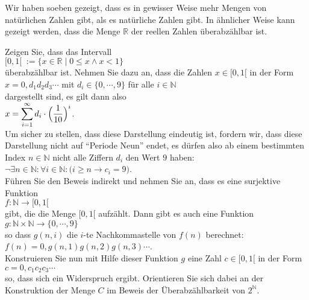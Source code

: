 \remark
Wir haben soeben gezeigt, dass es in gewisser Weise mehr Mengen von nat\"{u}rlichen Zahlen gibt, als es
nat\"{u}rliche Zahlen gibt.  In \"{a}hnlicher Weise kann gezeigt werden, dass die Menge $\mathbb{R}$ der reellen
Zahlen \"{u}berabz\"{a}hlbar ist.  

\exercise
Zeigen Sie, dass das Intervall
\\[0.2cm]
\hspace*{1.3cm}
$[0,1[ \;:= \{ x \in \mathbb{R} \mid 0 \leq x \wedge x < 1 \}$ 
\\[0.2cm]
\"{u}berabz\"{a}hlbar ist.  Nehmen Sie dazu an, dass die Zahlen $x \in [0,1[$ in der Form
\\[0.2cm]
\hspace*{1.3cm}
$ x = 0, d_1 d_2 d_3 \cdots$ \quad mit $d_i \in \{ 0, \cdots, 9 \}$  f\"{u}r alle $i \in \mathbb{N}$
\\[0.2cm]
dargestellt sind, es gilt dann also
\\[0.2cm]
\hspace*{1.3cm}
$\displaystyle x = \sum\limits_{i=1}^\infty d_i \cdot \Bigl(\frac{1}{10}\Bigr)^{i}$.
\\[0.2cm]
Um sicher zu stellen, dass diese Darstellung eindeutig ist, fordern wir, dass diese Darstellung
nicht auf ``Periode Neun'' endet, es d\"{u}rfen also ab einem bestimmten Index $n \in \mathbb{N}$ nicht
alle Ziffern $d_i$ den Wert $9$ haben:
\\[0.2cm]
\hspace*{1.3cm}
$\neg \exists n \in \mathbb{N}: \forall i \in \mathbb{N}:\bigl( i \geq n \rightarrow c_i = 9\bigr)$.
\\[0.2cm]
F\"{u}hren Sie den Beweis indirekt und nehmen Sie an, dass es eine surjektive Funktion 
\\[0.2cm]
\hspace*{1.3cm}
$f: \mathbb{N} \rightarrow [0,1[$
\\[0.2cm]
gibt, die die Menge $[0,1[$ aufz\"{a}hlt.  Dann gibt es auch eine Funktion
\\[0.2cm]
\hspace*{1.3cm}
$g: \mathbb{N} \times \mathbb{N} \rightarrow \{0, \cdots, 9\}$
\\[0.2cm]
so dass $g(n,i)$ die $i$-te Nachkommastelle von $f(n)$ berechnet:
\\[0.2cm]
\hspace*{1.3cm}
$f(n) = 0,g(n,1) g(n,2) g(n,3) \cdots$.
\\[0.2cm]
Konstruieren Sie nun mit Hilfe dieser Funktion $g$ eine Zahl $c \in [0,1[$ in der Form
\\[0.2cm]
\hspace*{1.3cm}
$c = 0,c_1c_2c_3 \cdots$
\\[0.2cm]
so, dass sich ein Widerspruch ergibt.  Orientieren Sie sich dabei an der Konstruktion der Menge $C$ im
Beweis der \"{U}berabz\"{a}hlbarkeit von $2^\mathbb{N}$.  \exend

